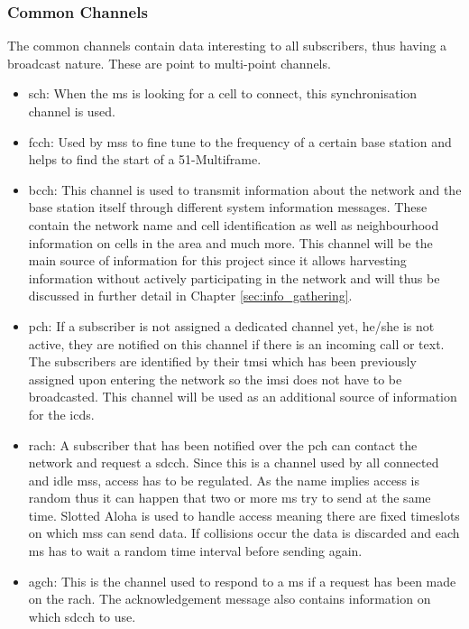 \subsubsection{Common Channels}
\label{sec:common_channels}
The common channels contain data interesting to all subscribers, thus having a broadcast nature.
These are point to multi-point channels.
\begin{itemize}
	\item \gls{sch}: When the \gls{ms} is looking for a cell to connect, this synchronisation channel is used.
	\item \gls{fcch}: Used by \glspl{ms} to fine tune to the frequency of a certain base station and helps to find the start of a 51-Multiframe.
	\item \gls{bcch}: This channel is used to transmit information about the network and the base station itself through different system information messages.
	These contain the network name and cell identification as well as neighbourhood information on cells in the area and much more.
	This channel will be the main source of information for this project since it allows harvesting information without actively participating in the network and will thus be discussed in further detail in Chapter \ref{sec:info_gathering}.
	\item \gls{pch}: If a subscriber is not assigned a dedicated channel yet, \ie he/she is not active, they are notified on this channel if there is an incoming call or text.
	The subscribers are identified by their \gls{tmsi} which has been previously assigned upon entering the network so the \gls{imsi} does not have to be broadcasted.
	This channel will be used as an additional source of information for the \gls{icds}.
	\item \gls{rach}: A subscriber that has been notified over the \gls{pch} can contact the network and request a \gls{sdcch}.
	Since this is a channel used by all connected and idle \glspl{ms}, access has to be regulated.
	As the name implies access is random thus it can happen that two or more \gls{ms} try to send at the same time.
	Slotted Aloha is used to handle access meaning there are fixed timeslots on which \glspl{ms} can send data.
	If collisions occur the data is discarded and each \gls{ms} has to wait a random time interval before sending again.
	\item \gls{agch}: This is the channel used to respond to a \gls{ms} if a request has been made on the \gls{rach}.
	The acknowledgement message also contains information on which \gls{sdcch} to use.
\end{itemize}


